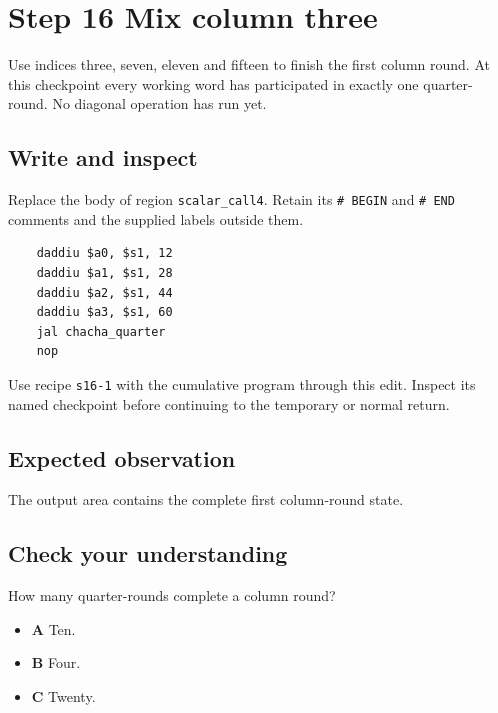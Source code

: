 \section{Step 16 Mix column three}\label{chacha-s16}

Use indices three, seven, eleven and fifteen to finish the first column round. At this checkpoint every working word has participated in exactly one quarter-round. No diagonal operation has run yet.

\subsection{Write and inspect}
Replace the body of region \texttt{scalar\_call4}. Retain its \texttt{\# BEGIN} and \texttt{\# END} comments and the supplied labels outside them.

\begin{verbatim}
    daddiu $a0, $s1, 12
    daddiu $a1, $s1, 28
    daddiu $a2, $s1, 44
    daddiu $a3, $s1, 60
    jal chacha_quarter
    nop
\end{verbatim}

Use recipe \texttt{s16-1} with the cumulative program through this edit. Inspect its named checkpoint before continuing to the temporary or normal return.

\subsection{Expected observation}
The output area contains the complete first column-round state.

\subsection{Check your understanding}
How many quarter-rounds complete a column round?

\begin{itemize}
  \item \textbf{A} Ten.
  \item \textbf{B} Four.
  \item \textbf{C} Twenty.
\end{itemize}
